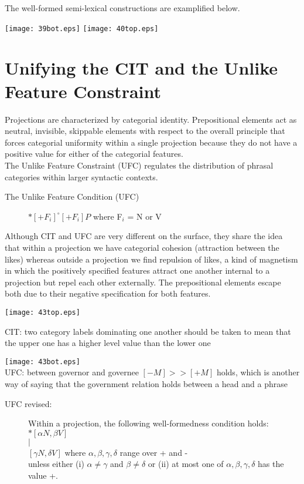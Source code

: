 \documentclass{article}
\begin{document}
The well-formed semi-lexical constructions are examplified below. 
\begin{example}
\texttt{[image: 39bot.eps]}
\texttt{[image: 40top.eps]}

   \end{example}

\section{Unifying the CIT and the Unlike Feature Constraint}
Projections are characterized by categorial identity. Prepositional elements act as neutral, invisible, skippable elements with respect to the overall principle that forces categorial uniformity within a single projection because they do not have a positive value for either of the categorial features. \\
The Unlike Feature Constraint (UFC) regulates the distribution of phrasal categories within larger syntactic contexts. 
\begin{example}
\begin{description}
\item[The Unlike Feature Condition (UFC) ]
$*{[+F_{i}]^\circ [+F_{i}]P}$ where F$_{i}$ = N or V 
\end{description}
\end{example}
Although CIT and UFC are very different on the surface, they share the idea that within a projection we have categorial cohesion (attraction between the likes) whereas outside a projection we find repulsion of likes, a kind of magnetism in which the positively specified features attract one another internal to a  projection but repel each other externally. The prepositional elements escape both due to their negative specification for both features. 

\begin{example}
\texttt{[image: 43top.eps]}

CIT: two category labels dominating one another should be taken to mean that the upper one has a higher level value than the lower one

\texttt{[image: 43bot.eps]}\\
UFC: between governor and governee $[-M] >> [+M]$ holds, which is another way of saying that the government relation holds between a head and a phrase

   \end{example}

\begin{example}
\begin{description}
\item[UFC revised: ] 
Within a projection, the following well-formedness condition holds:\\
$*[\alpha N, \beta V]$\\
 $\mid$ \\
 $[\gamma N, \delta V]$ where $\alpha, \beta, \gamma, \delta$ range over + and -\\
 unless either (i) $\alpha \neq \gamma$ and $\beta \neq \delta$ or (ii) at most one of $\alpha, \beta, \gamma, \delta$ has the value +.
\end{description}
\end{example}
\end{document}
